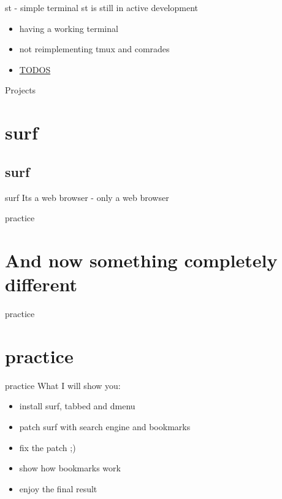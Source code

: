 \documentclass[10pt,graphics,aspectratio=169,table]{beamer}
\begin{document}
\begin{frame}{st - simple terminal}
st is still in active development
\begin{itemize}
    \item having a working terminal
    \item not reimplementing tmux and comrades
    \item \href{https://git.suckless.org/st/file/TODO.html}{TODOS}
\end{itemize}
\end{frame}

\begin{frame}{Projects}
\section*{surf}
\subsection{surf}
\end{frame}

\begin{frame}{surf}
Its a web browser - only a web browser
\end{frame}

\begin{frame}{practice}
    \section*{And now something completely different}

\end{frame}
\begin{frame}{practice}
    \section{practice}
\end{frame}

\begin{frame}{practice}
What I will show you:
    \begin{itemize}
        \item install surf, tabbed and dmenu
        \item patch surf with search engine and bookmarks
        \item fix the patch ;)
        \item show how bookmarks work
        \item enjoy the final result
    \end{itemize}
\end{frame}
\end{document}
